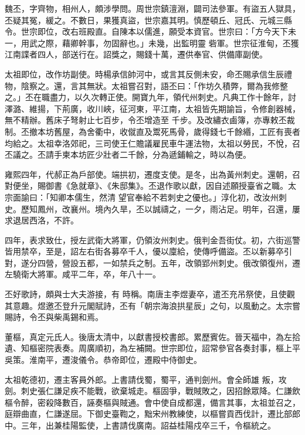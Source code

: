 \begin{pinyinscope}
 魏丕，字齊物，相州人，頗涉學問。周世宗鎮澶淵，闢司法參軍。有盜五人獄具，丕疑其冤，緩之。不數日，果獲真盜，世宗嘉其明。慎歷頓丘、冠氏、元城三縣令。世宗即位，改右班殿直。自陳本以儒進，願受本資官。世宗曰：「方今天下未一，用武之際，藉卿幹事，勿固辭也。」未幾，出監明靈
 砦軍。世宗征淮甸，丕獲江南諜者四人，部送行在。詔獎之，賜錢十萬，遷供奉官、供備庫副使。



 太祖即位，改作坊副使。時楊承信帥河中，或言其反側未安，命丕賜承信生辰禮物，陰察之。還，言其無狀。太祖嘗召對，語丕曰：「作坊久積弊，爾為我修整之。」丕在職盡力，以久次轉正使。開寶九年，領代州刺史。凡典工作十餘年，討澤潞、維揚，下荊廣，收川峽，征河東，平江南，太祖皆先期諭旨，令修創器械，無不精辦。舊床子弩射止七百步，令丕增造至
 千步。及改繡衣鹵簿，亦專敕丕裁制。丕撤本坊舊屋，為舍衢中，收僦直及鬻死馬骨，歲得錢七千餘緡，工匠有喪者均給之。太祖幸洛郊祀，三司使王仁贍議雇民車牛運法物，太祖以勞民，不悅，召丕議之。丕請手柬本坊匠少壯者二千餘，分為遞鋪輸之，時以為便。



 雍熙四年，代郝正為戶部使。端拱初，遷度支使。是冬，出為黃州刺史。還朝，召對便坐，賜御書《急就章》、《朱邸集》。丕退作歌以獻，因自述願授臺省之職。太宗面諭曰：「知卿本儒生，然清
 望官奉給不若刺史之優也。」淳化初，改汝州刺史。歷知鳳州，改襄州。境內久旱，丕以誠禱之，一夕，雨沾足。明年，召還，屢求退居西洛，不許。



 四年，表求致仕，授左武衛大將軍，仍領汝州刺史。俄判金吾街仗。初，六街巡警皆用禁卒，至是，詔左右街各募卒千人，優以廩給，使傳呼備盜。丕以新募卒引對，遂分四營，營設五都，一如禁兵之制。五年，改領郢州刺史。俄改領復州，遷左驍衛大將軍。咸平二年，卒，年八十一。



 丕好歌詩，頗與士大夫游接，有
 時稱。南唐主李煜妻卒，遣丕充吊祭使，且使觀其意趣。煜邀丕登升元閣賦詩，丕有「朝宗海浪拱星辰」之句，以風動之。太宗嘗賜詩，令丕與柴禹錫和焉。



 董樞，真定元氏人。後唐太清中，以獻書授校書郎。累歷賓佐。晉天福中，為左拾遺、知樞密院表奏。周廣順初，為左補闕。世宗即位，詔常參官各奏封事，樞上平吳策。淮南平，遷浚儀令。恭帝即位，遷殿中侍御史。



 太祖乾德初，遷主客員外郎。上書請伐蜀，蜀平，通判劍州。會全師雄
 叛，攻劍。刺史張仁謙足疾不能戰，欲棄城走。樞固爭，戰賊敗之，因招餘眾降。仁謙飲樞令醉，密殺降數百，誣奏樞與賊通。會中使自成都還，備言其事，太祖並召之，庭辯曲直，仁謙遂屈。下御史臺鞫之，黜宋州教練使，以樞嘗貢西伐計，遷比部郎中。三年，出兼桂陽監使，上書請伐廣南。詔益桂陽戍卒三千，令樞統之。




\end{pinyinscope}
